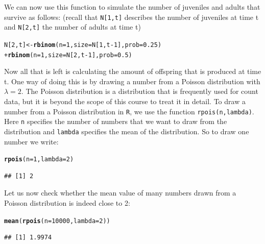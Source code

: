 \documentclass{article}\usepackage[]{graphicx}\usepackage[]{color}
\makeatletter
\newcommand{\hlnum}[1]{\textcolor[rgb]{0.686,0.059,0.569}{#1}}%
\newcommand{\hlopt}[1]{\textcolor[rgb]{0,0,0}{#1}}%
\newcommand{\hlstd}[1]{\textcolor[rgb]{0.345,0.345,0.345}{#1}}%
\newcommand{\hlkwb}[1]{\textcolor[rgb]{0.69,0.353,0.396}{#1}}%
\newcommand{\hlkwc}[1]{\textcolor[rgb]{0.333,0.667,0.333}{#1}}%
\newcommand{\hlkwd}[1]{\textcolor[rgb]{0.737,0.353,0.396}{\textbf{#1}}}%
\newenvironment{kframe}{%
 \def\at@end@of@kframe{}%
 \ifinner\ifhmode%
  \def\at@end@of@kframe{\end{minipage}}%
  \begin{minipage}{\columnwidth}%
 \fi\fi%
 \def\FrameCommand##1{\hskip\@totalleftmargin \hskip-\fboxsep
 \colorbox{shadecolor}{##1}\hskip-\fboxsep
     \hskip-\linewidth \hskip-\@totalleftmargin \hskip\columnwidth}%
 \MakeFramed {\advance\hsize-\width
   \@totalleftmargin\z@ \linewidth\hsize
   \@setminipage}}%
 {\par\unskip\endMakeFramed%
 \at@end@of@kframe}
\newenvironment{knitrout}{}{} %
\makeatother
\begin{document}
We can now use this function to simulate the number of juveniles and adults that survive as follows:
(recall that \texttt{N[1,t]} describes the number of juveniles at time t and \texttt{N[2,t]} the number of adults at time t)
\begin{knitrout}
\color{fgcolor}\begin{kframe}
\begin{alltt}
\hlstd{N[}\hlnum{2}\hlstd{,t]}\hlkwb{<-}\hlkwd{rbinom}\hlstd{(}\hlkwc{n}\hlstd{=}\hlnum{1}\hlstd{,}\hlkwc{size}\hlstd{=N[}\hlnum{1}\hlstd{,t}\hlopt{-}\hlnum{1}\hlstd{],}\hlkwc{prob}\hlstd{=}\hlnum{0.25}\hlstd{)}
        \hlopt{+} \hlkwd{rbinom}\hlstd{(}\hlkwc{n}\hlstd{=}\hlnum{1}\hlstd{,}\hlkwc{size}\hlstd{=N[}\hlnum{2}\hlstd{,t}\hlopt{-}\hlnum{1}\hlstd{],}\hlkwc{prob}\hlstd{=}\hlnum{0.5}\hlstd{)}
\end{alltt}
\end{kframe}
\end{knitrout}
Now all that is left is calculating the amount of offspring that is produced at time t. One way of doing this is by drawing a number from a Poisson distribution with $\lambda=2$. The Poisson distribution is a distribution that is frequently used for count data, but it is beyond the scope of this course to treat it in detail. To draw a number from a Poisson distribution in \texttt{R}, we use the function \texttt{rpois(n,lambda)}. Here \texttt{n} specifies the number of numbers that we want to draw from the distribution and \texttt{lambda} specifies the mean of the distribution. So to draw one number we write:
\begin{knitrout}
\color{fgcolor}\begin{kframe}
\begin{alltt}
\hlkwd{rpois}\hlstd{(}\hlkwc{n}\hlstd{=}\hlnum{1}\hlstd{,}\hlkwc{lambda}\hlstd{=}\hlnum{2}\hlstd{)}
\end{alltt}
\begin{verbatim}
## [1] 2
\end{verbatim}
\end{kframe}
\end{knitrout}
Let us now check whether the mean value of many numbers drawn from a Poisson distribution is indeed close to 2:
\begin{knitrout}
\color{fgcolor}\begin{kframe}
\begin{alltt}
\hlkwd{mean}\hlstd{(}\hlkwd{rpois}\hlstd{(}\hlkwc{n}\hlstd{=}\hlnum{10000}\hlstd{,}\hlkwc{lambda}\hlstd{=}\hlnum{2}\hlstd{))}
\end{alltt}
\begin{verbatim}
## [1] 1.9974
\end{verbatim}
\end{kframe}
\end{knitrout}
\end{document}
